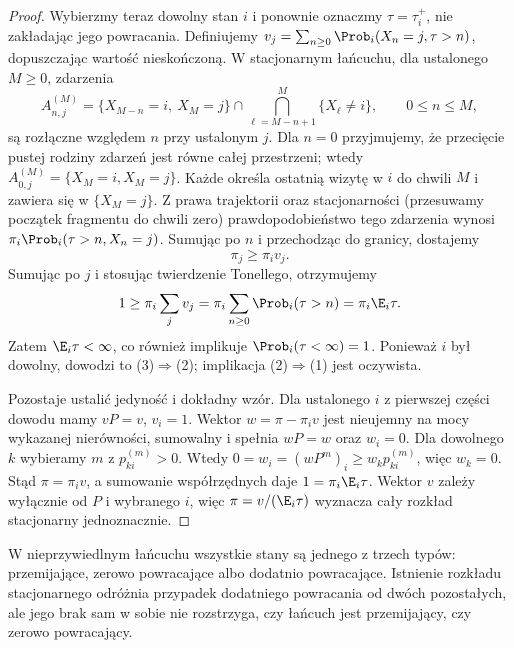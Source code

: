 \begin{proof}
Wybierzmy teraz dowolny stan $i$ i ponownie oznaczmy
$\tau=\tau_i^+$, nie zakładając jego powracania.
Definiujemy $v_j=\sum_{n\geq0}\Prob_i(X_n=j,\tau>n)$,
dopuszczając wartość nieskończoną. W stacjonarnym
łańcuchu, dla ustalonego $M\geq0$, zdarzenia
\[
A_{n,j}^{(M)}=\{X_{M-n}=i,\ X_M=j\}
\cap\bigcap_{\ell=M-n+1}^{M}\{X_\ell\ne i\},
\qquad 0\leq n\leq M,
\]
są rozłączne względem $n$ przy ustalonym $j$.
Dla $n=0$ przyjmujemy, że przecięcie pustej
rodziny zdarzeń jest równe całej przestrzeni;
wtedy $A_{0,j}^{(M)}=\{X_M=i,X_M=j\}$.
Każde określa ostatnią wizytę w $i$ do chwili $M$
i zawiera się w $\{X_M=j\}$. Z prawa trajektorii
oraz stacjonarności (przesuwamy początek fragmentu
do chwili zero) prawdopodobieństwo tego
zdarzenia wynosi $\pi_i\Prob_i(\tau>n,X_n=j)$.
Sumując po $n$ i przechodząc do granicy, dostajemy
\[
\pi_j\geq\pi_i v_j.
\]
Sumując po $j$ i stosując twierdzenie Tonellego,
otrzymujemy
\[
1\geq\pi_i\sum_jv_j
=\pi_i\sum_{n\geq0}\Prob_i(\tau>n)
=\pi_i\E_i\tau.
\]
Zatem $\E_i\tau<\infty$, co również implikuje
$\Prob_i(\tau<\infty)=1$. Ponieważ $i$ był dowolny,
dowodzi to (3)$\Rightarrow$(2); implikacja
(2)$\Rightarrow$(1) jest oczywista.

Pozostaje ustalić jedyność i dokładny wzór.
Dla ustalonego $i$ z pierwszej części dowodu mamy
$vP=v$, $v_i=1$. Wektor $w=\pi-\pi_iv$ jest
nieujemny na mocy wykazanej nierówności,
sumowalny i spełnia $wP=w$ oraz $w_i=0$.
Dla dowolnego $k$ wybieramy $m$ z $p_{ki}^{(m)}>0$.
Wtedy $0=w_i=(wP^m)_i\geq w_kp_{ki}^{(m)}$,
więc $w_k=0$. Stąd $\pi=\pi_iv$, a sumowanie
współrzędnych daje $1=\pi_i\E_i\tau$.
Wektor $v$ zależy wyłącznie od $P$ i wybranego $i$,
więc $\pi=v/(\E_i\tau)$ wyznacza cały rozkład
stacjonarny jednoznacznie.
\end{proof}

\begin{uwaga}
W nieprzywiedlnym łańcuchu wszystkie stany są
jednego z trzech typów: przemijające, zerowo
powracające albo dodatnio powracające. Istnienie
rozkładu stacjonarnego odróżnia przypadek dodatniego
powracania od dwóch pozostałych, ale jego brak sam
w sobie nie rozstrzyga, czy łańcuch jest przemijający,
czy zerowo powracający.
\end{uwaga}

